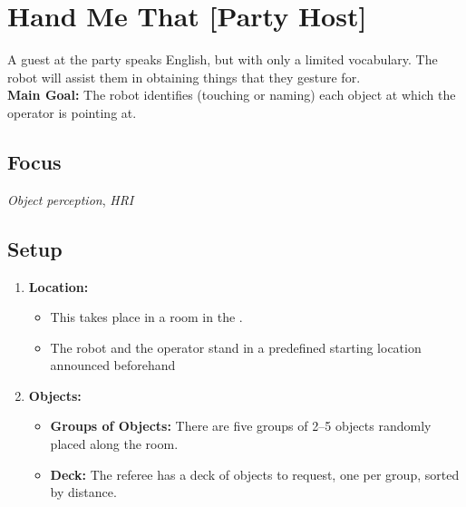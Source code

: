 \section{Hand Me That [Party Host]}
\label{test:hand-me-that}
A guest at the party speaks English, but with only a limited vocabulary. The robot will assist them in obtaining things that they gesture for.\\



\noindent \textbf{Main Goal:} The robot identifies (touching or naming) each object at which the operator is pointing at.

\subsection*{Focus}
\emph{Object perception}, \emph{HRI}


%
%
\subsection*{Setup}
\begin{enumerate}[nosep]
	\item \textbf{Location:} 
	\begin{itemize}[nosep]
		\item This takes place in a room in the \Arena{}.
		\item The robot and the operator stand in a predefined starting location announced beforehand %
	\end{itemize}
	    \item \textbf{Objects:} 
		\begin{itemize}[nosep] 
		\item \textbf{Groups of Objects: }There are five groups of 2--5 objects randomly placed along the room.
		\item \textbf{Deck:} The referee has a deck of objects to request, one per group, sorted by distance.
		\end{itemize}

\end{enumerate}


